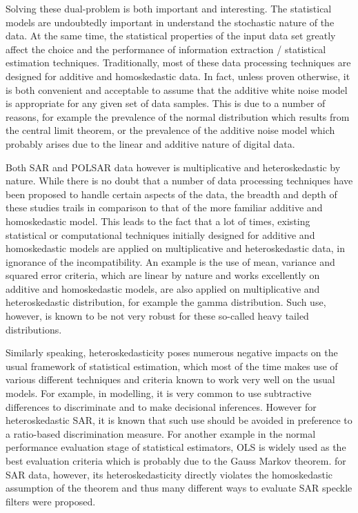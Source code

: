 Solving these dual-problem is both important and interesting.
The statistical models are undoubtedly important in understand the stochastic nature of the data. 
At the same time, the statistical properties of the input data set greatly affect the choice and the performance of information extraction / statistical estimation techniques.
Traditionally, most of these data processing techniques are designed for additive and homoskedastic data.
In fact, unless proven otherwise, it is both convenient and acceptable to assume that the additive white noise model is appropriate for any given set of data samples.
This is due to a number of reasons, for example the prevalence of the normal distribution which results from the central limit theorem, or the prevalence of the additive noise model which probably arises due to the linear and additive nature of digital data.%

Both SAR and POLSAR data however is multiplicative and heteroskedastic by nature.
While there is no doubt that a number of data processing techniques have been proposed to handle certain aspects of the data, the breadth and depth of these studies trails in comparison to that of the more familiar additive and homoskedastic model.
This leads to the fact that a lot of times, existing statistical or computational techniques initially designed for additive and homoskedastic models are applied on multiplicative and heteroskedastic data, in ignorance of the incompatibility. 
An example is the use of mean, variance and squared error criteria, which are linear by nature and works excellently on additive and homoskedastic models, are also applied on multiplicative and heteroskedastic distribution, for example the gamma distribution.
Such use, however, is known to be not very robust for these so-called heavy tailed distributions.

Similarly speaking, heteroskedasticity poses numerous negative impacts on the usual framework of statistical estimation, which most of the time makes use of various different techniques and criteria known to work very well on the usual models.
For example, in modelling, it is very common to use subtractive differences to discriminate and to make decisional inferences. However for heteroskedastic SAR, it is known that such use should be avoided in preference to a ratio-based discrimination measure.
For another example in the normal performance evaluation stage of statistical estimators, OLS is widely used as the best evaluation criteria which is probably due to the Gauss Markov theorem.
for SAR data, however, its heteroskedasticity directly violates the homoskedastic assumption of the theorem and thus many different ways to evaluate SAR speckle filters were proposed.


